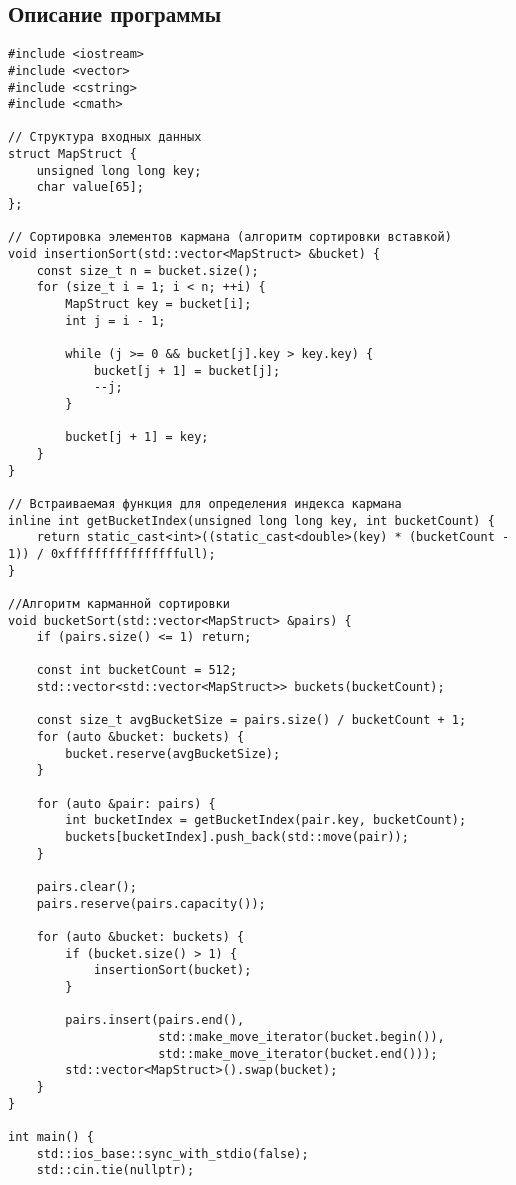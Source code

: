 \documentclass[12pt]{article}
\begin{document}
\newpage
\subsection*{Описание программы}
\begin{verbatim}
#include <iostream>
#include <vector>
#include <cstring>
#include <cmath>

// Структура входных данных
struct MapStruct {
    unsigned long long key;
    char value[65];
};

// Сортировка элементов кармана (алгоритм сортировки вставкой)
void insertionSort(std::vector<MapStruct> &bucket) {
    const size_t n = bucket.size();
    for (size_t i = 1; i < n; ++i) {
        MapStruct key = bucket[i];
        int j = i - 1;

        while (j >= 0 && bucket[j].key > key.key) {
            bucket[j + 1] = bucket[j];
            --j;
        }

        bucket[j + 1] = key;
    }
}

// Встраиваемая функция для определения индекса кармана
inline int getBucketIndex(unsigned long long key, int bucketCount) {
    return static_cast<int>((static_cast<double>(key) * (bucketCount - 1)) / 0xffffffffffffffffull);
}

//Алгоритм карманной сортировки
void bucketSort(std::vector<MapStruct> &pairs) {
    if (pairs.size() <= 1) return;

    const int bucketCount = 512;
    std::vector<std::vector<MapStruct>> buckets(bucketCount);

    const size_t avgBucketSize = pairs.size() / bucketCount + 1;
    for (auto &bucket: buckets) {
        bucket.reserve(avgBucketSize);
    }

    for (auto &pair: pairs) {
        int bucketIndex = getBucketIndex(pair.key, bucketCount);
        buckets[bucketIndex].push_back(std::move(pair));
    }

    pairs.clear();
    pairs.reserve(pairs.capacity());

    for (auto &bucket: buckets) {
        if (bucket.size() > 1) {
            insertionSort(bucket);
        }

        pairs.insert(pairs.end(),
                     std::make_move_iterator(bucket.begin()),
                     std::make_move_iterator(bucket.end()));
        std::vector<MapStruct>().swap(bucket);
    }
}

int main() {
    std::ios_base::sync_with_stdio(false);
    std::cin.tie(nullptr);


\end{verbatim}
\end{document}
